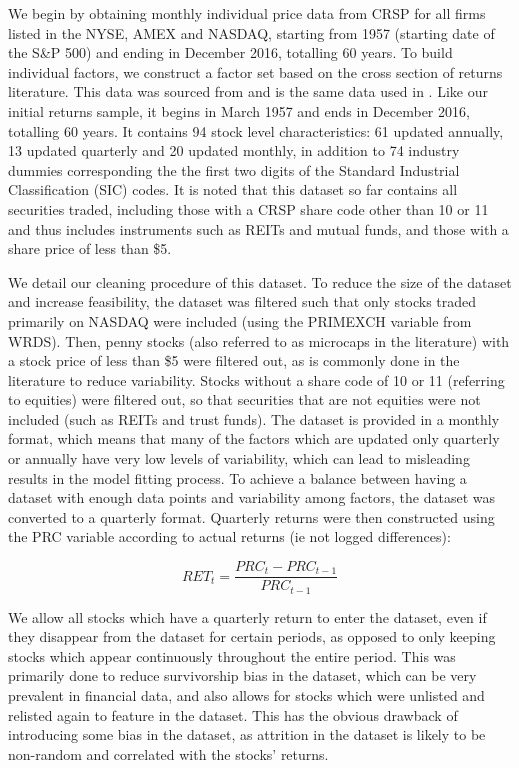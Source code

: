 \documentclass{article}
\begin{document}
We begin by obtaining monthly individual price data from CRSP for all firms listed in the NYSE, AMEX and NASDAQ, starting from 1957 (starting date of the S\&P 500) and ending in December 2016, totalling 60 years. To build individual factors, we construct a factor set based on the cross section of returns literature. This data was sourced from and is the same data used in \cite{gu_empirical_2018}. Like our initial returns sample, it begins in March 1957 and ends in December 2016, totalling 60 years. It contains 94 stock level characteristics: 61 updated annually, 13 updated quarterly and 20 updated monthly, in addition to 74 industry dummies corresponding the the first two digits of the Standard Industrial Classification (SIC) codes. It is noted that this dataset so far contains all securities traded, including those with a CRSP share code other than 10 or 11 and thus includes instruments such as REITs and mutual funds, and those with a share price of less than \$5.


We detail our cleaning procedure of this dataset. To reduce the size of the dataset and increase feasibility, the dataset was filtered such that only stocks traded primarily on NASDAQ were included (using the PRIMEXCH variable from WRDS). Then, penny stocks (also referred to as microcaps in the literature) with a stock price of less than \$5 were filtered out, as is commonly done in the literature to reduce variability. Stocks without a share code of 10 or 11 (referring to equities) were filtered out, so that securities that are not equities were not included (such as REITs and trust funds). The dataset is provided in a monthly format, which means that many of the factors which are updated only quarterly or annually have very low levels of variability, which can lead to misleading results in the model fitting process. To achieve a balance between having a dataset with enough data points and variability among factors, the dataset was converted to a quarterly format. Quarterly returns were then constructed using the PRC variable according to actual returns (ie not logged differences):

\begin{equation}
RET_t = \frac{PRC_t - PRC_{t-1}}{PRC_{t-1}}
\end{equation}

We allow all stocks which have a quarterly return to enter the dataset, even if they disappear from the dataset for certain periods, as opposed to only keeping stocks which appear continuously throughout the entire period. This was primarily done to reduce survivorship bias in the dataset, which can be very prevalent in financial data, and also allows for stocks which were unlisted and relisted again to feature in the dataset. This has the obvious drawback of introducing some bias in the dataset, as attrition in the dataset is likely to be non-random and correlated with the stocks' returns. 
\end{document}
